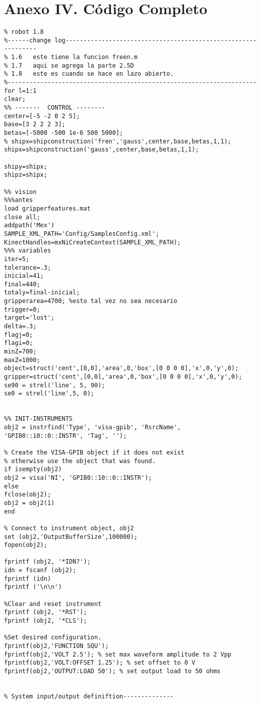 \section{Anexo IV. Código Completo}\label{codefull}
\begin{lstlisting}
% robot 1.8
%------change log--------------------------------------------------------------
% 1.6   este tiene la funcion freen.m
% 1.7   aqui se agrega la parte 2.5D  
% 1.8   este es cuando se hace en lazo abierto.
%---------------------------------------------------------------------
for l=1:1
clear;
%% -------  CONTROL --------
center=[-5 -2 0 2 5];
base=[3 2 2 2 3];
betas=[-5000 -500 1e-6 500 5000];
% shipx=shipconstruction('fren','gauss',center,base,betas,1,1);
shipx=shipconstruction('gauss',center,base,betas,1,1);

shipy=shipx;
shipz=shipx;

%% vision
%%%antes
load gripperfeatures.mat
close all;
addpath('Mex')
SAMPLE_XML_PATH='Config/SamplesConfig.xml';
KinectHandles=mxNiCreateContext(SAMPLE_XML_PATH);
%%% variables
iter=5;
tolerance=.3;
inicial=41;
final=440;
totaly=final-inicial;
gripperarea=4700; %esto tal vez no sea necesario
trigger=0;
target='lost';
delta=.3;
flagj=0;
flagi=0;
minZ=700;
maxZ=1000;
object=struct('cent',[0,0],'area',0,'box',[0 0 0 0],'x',0,'y',0);
gripper=struct('cent',[0,0],'area',0,'box',[0 0 0 0],'x',0,'y',0);
se90 = strel('line', 5, 90);
se0 = strel('line',5, 0);


%% INIT-INSTRUMENTS
obj2 = instrfind('Type', 'visa-gpib', 'RsrcName', 'GPIB0::10::0::INSTR', 'Tag', '');

% Create the VISA-GPIB object if it does not exist
% otherwise use the object that was found.
if isempty(obj2)
obj2 = visa('NI', 'GPIB0::10::0::INSTR');
else
fclose(obj2);
obj2 = obj2(1)
end

% Connect to instrument object, obj2
set (obj2,'OutputBufferSize',100000);
fopen(obj2);

fprintf (obj2, '*IDN?');
idn = fscanf (obj2);
fprintf (idn)
fprintf ('\n\n')

%Clear and reset instrument
fprintf (obj2, '*RST');
fprintf (obj2, '*CLS');

%Set desired configuration.
fprintf(obj2,'FUNCTION SQU');
fprintf(obj2,'VOLT 2.5'); % set max waveform amplitude to 2 Vpp
fprintf(obj2,'VOLT:OFFSET 1.25'); % set offset to 0 V
fprintf(obj2,'OUTPUT:LOAD 50'); % set output load to 50 ohms


% System input/output definiftion--------------


\end{lstlisting}
